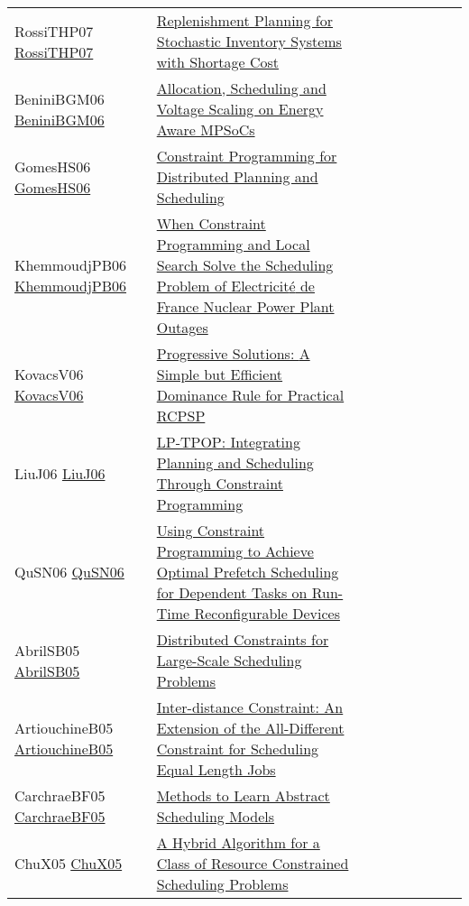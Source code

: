 {\begin{longtable}{p{3cm}p{7cm}lllllll}
RossiTHP07 \href{https://doi.org/10.1007/978-3-540-72397-4\_17}{RossiTHP07} &  \href{papers/RossiTHP07.pdf}{Replenishment Planning for Stochastic Inventory Systems with Shortage Cost} &  &  &  &  &  &  & \\
BeniniBGM06 \href{https://doi.org/10.1007/11757375\_6}{BeniniBGM06} &  \href{papers/BeniniBGM06.pdf}{Allocation, Scheduling and Voltage Scaling on Energy Aware MPSoCs} &  &  &  &  &  &  & \\
GomesHS06 \href{http://www.aaai.org/Library/Symposia/Spring/2006/ss06-04-024.php}{GomesHS06} &  \href{papers/GomesHS06.pdf}{Constraint Programming for Distributed Planning and Scheduling} &  &  &  &  &  &  & \\
KhemmoudjPB06 \href{https://doi.org/10.1007/11889205\_21}{KhemmoudjPB06} &  \href{papers/KhemmoudjPB06.pdf}{When Constraint Programming and Local Search Solve the Scheduling Problem of Electricit{\'{e}} de France Nuclear Power Plant Outages} &  &  &  &  &  &  & \\
KovacsV06 \href{https://doi.org/10.1007/11757375\_13}{KovacsV06} &  \href{papers/KovacsV06.pdf}{Progressive Solutions: {A} Simple but Efficient Dominance Rule for Practical {RCPSP}} &  &  &  &  &  &  & \\
LiuJ06 \href{https://doi.org/10.1007/11801603\_92}{LiuJ06} &  \href{papers/LiuJ06.pdf}{{LP-TPOP:} Integrating Planning and Scheduling Through Constraint Programming} &  &  &  &  &  &  & \\
QuSN06 \href{https://doi.org/10.1109/ISSOC.2006.321973}{QuSN06} &  \href{papers/QuSN06.pdf}{Using Constraint Programming to Achieve Optimal Prefetch Scheduling for Dependent Tasks on Run-Time Reconfigurable Devices} &  &  &  &  &  &  & \\
AbrilSB05 \href{https://doi.org/10.1007/11564751\_75}{AbrilSB05} &  \href{papers/AbrilSB05.pdf}{Distributed Constraints for Large-Scale Scheduling Problems} &  &  &  &  &  &  & \\
ArtiouchineB05 \href{https://doi.org/10.1007/11564751\_8}{ArtiouchineB05} &  \href{papers/ArtiouchineB05.pdf}{Inter-distance Constraint: An Extension of the All-Different Constraint for Scheduling Equal Length Jobs} &  &  &  &  &  &  & \\
CarchraeBF05 \href{https://doi.org/10.1007/11564751\_80}{CarchraeBF05} &  \href{papers/CarchraeBF05.pdf}{Methods to Learn Abstract Scheduling Models} &  &  &  &  &  &  & \\
ChuX05 \href{https://doi.org/10.1007/11493853\_10}{ChuX05} &  \href{papers/ChuX05.pdf}{A Hybrid Algorithm for a Class of Resource Constrained Scheduling Problems} &  &  &  &  &  &  & \\

\end{longtable}}
